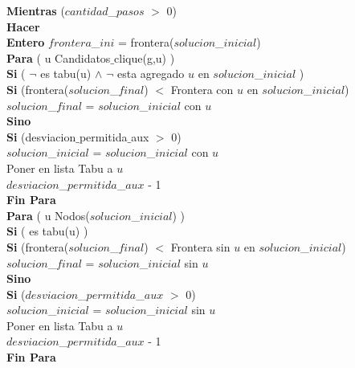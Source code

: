 \begin{algorithm}[H]
	\textbf{Mientras} ($cantidad$\_$pasos$ $>$ 0) \\
	\hspace{4mm} \textbf{Hacer} \\
	\hspace{8mm}     \textbf{Entero} $frontera$\_$ini$ = frontera($solucion$\_$inicial$) \\
	\hspace{8mm} \textbf{Para} ( u \in Candidatos$\_$clique(g,u) ) \\
	\hspace{12mm} \textbf{Si} ( $\neg$ es tabu(u) $\wedge$ $\neg$ esta agregado $u$ en $solucion$\_$inicial$ ) \\
	\hspace{16mm} \textbf{Si} (frontera($solucion$\_$final$) $<$ Frontera con $u$ en $solucion$\_$inicial$) \\
	\hspace{20mm}  $solucion$\_$final$ = $solucion$\_$inicial$ con $u$ \\
	\hspace{16mm} \textbf{Sino} \\
	\hspace{20mm}  \textbf{Si} (desviacion$\_$permitida$\_$aux $>$ 0) \\
	\hspace{24mm} $solucion$\_$inicial$ = $solucion$\_$inicial$ con $u$ \\
	\hspace{24mm} Poner en lista Tabu a $u$ \\
	\hspace{24mm} $desviacion$\_$permitida$\_$aux$  - 1 \\
	\hspace{8mm} \textbf{Fin Para} \\
	\hspace{8mm} \textbf{Para} ( u \in Nodos($solucion$\_$inicial$) ) \\
	\hspace{12mm} \textbf{Si} ( \neg es tabu(u) ) \\
	\hspace{16mm} \textbf{Si }(frontera($solucion$\_$final$) $<$ Frontera sin $u$ en $solucion$\_$inicial$) \\
	\hspace{20mm} $solucion$\_$final$ = $solucion$\_$inicial$ sin $u$ \\
	\hspace{16mm} \textbf{Sino} \\
	\hspace{20mm} \textbf{Si} ($desviacion$\_$permitida$\_$aux$ $>$ 0) \\
	\hspace{24mm} $solucion$\_$inicial$ = $solucion$\_$inicial$ sin $u$ \\
	\hspace{24mm} Poner en lista Tabu a $u$ \\
	\hspace{24mm} $desviacion$\_$permitida$\_$aux$  - 1 \\
	\hspace{8mm} \textbf{Fin Para} \\
							

\end{algorithm}
